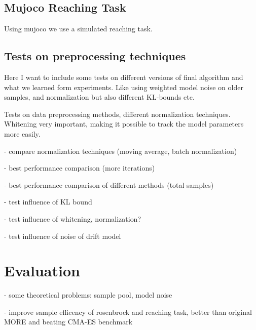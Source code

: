 \subsection{Mujoco Reaching Task}
Using mujoco we use a simulated reaching task.

\subsection{Tests on preprocessing techniques}
Here I want to include some tests on different versions
of final algorithm and what we learned form experiments.
Like using weighted model noise on older samples, and
normalization but also different KL-bounds etc.


Tests on data preprocessing methods, different normalization techniques.
Whitening very important, making it possible to track the model parameters
more easily.

- compare normalization techniques (moving average, batch normalization)

- best performance comparison (more iterations)

- best performance comparison of different methods (total samples)

- test influence of KL bound

- test influence of whitening, normalization?

- test influence of noise of drift model

\section{Evaluation}
- some theoretical problems: sample pool, model noise

- improve sample efficency of rosenbrock and reaching task,
better than original MORE and beating CMA-ES benchmark

